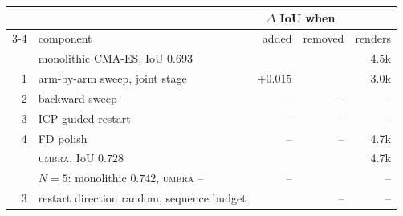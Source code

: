 \begin{tabular}{@{}rlrrr@{}}
\toprule
 & & \multicolumn{2}{c}{$\Delta$ IoU when} & \\
\cmidrule(lr){3-4}
 & component & added & removed & renders \\
\midrule
 & monolithic CMA-ES, IoU $0.693$ & & & 4.5k \\
1 & arm-by-arm sweep, joint stage & $+0.015$ &  & 3.0k \\
2 & backward sweep & -- & -- & -- \\
3 & ICP-guided restart & -- & -- & -- \\
4 & FD polish & -- & -- & 4.7k \\
 & \textsc{umbra}, IoU $0.728$ & & & 4.7k \\
\midrule
 & $N{=}5$: monolithic $0.742$, \textsc{umbra} -- & -- & & -- \\
3 & restart direction random, sequence budget & & -- & -- \\
\bottomrule
\end{tabular}
